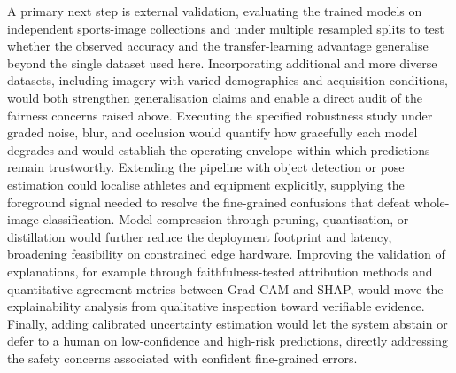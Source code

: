 A primary next step is external validation, evaluating the trained models on independent sports-image collections and under multiple resampled splits to test whether the observed accuracy and the transfer-learning advantage generalise beyond the single dataset used here.
Incorporating additional and more diverse datasets, including imagery with varied demographics and acquisition conditions, would both strengthen generalisation claims and enable a direct audit of the fairness concerns raised above.
Executing the specified robustness study under graded noise, blur, and occlusion would quantify how gracefully each model degrades and would establish the operating envelope within which predictions remain trustworthy.
Extending the pipeline with object detection or pose estimation could localise athletes and equipment explicitly, supplying the foreground signal needed to resolve the fine-grained confusions that defeat whole-image classification.
Model compression through pruning, quantisation, or distillation would further reduce the deployment footprint and latency, broadening feasibility on constrained edge hardware.
Improving the validation of explanations, for example through faithfulness-tested attribution methods and quantitative agreement metrics between Grad-CAM and SHAP, would move the explainability analysis from qualitative inspection toward verifiable evidence.
Finally, adding calibrated uncertainty estimation would let the system abstain or defer to a human on low-confidence and high-risk predictions, directly addressing the safety concerns associated with confident fine-grained errors.
